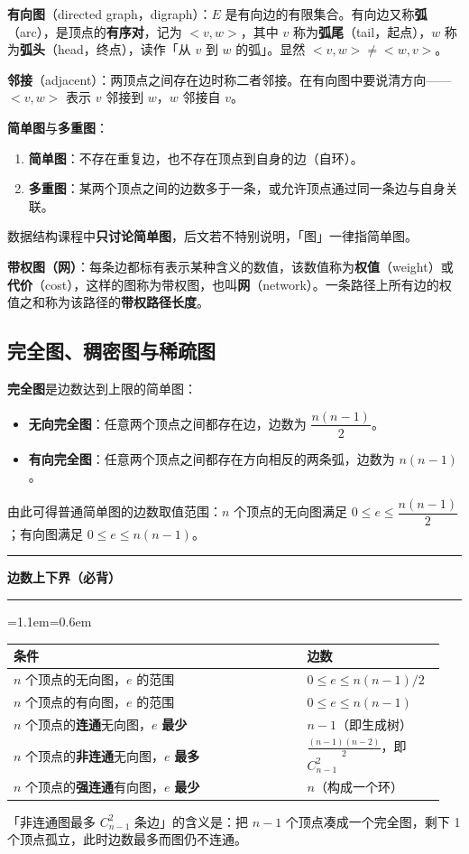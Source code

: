 \documentclass[11pt,openany,UTF8]{ctexbook}
\newcommand{\callouthead}[2]{%
  \par\addvspace{7pt}\noindent
  {\color{#1}\rule[-0.15em]{3pt}{1.05em}}\hspace{0.5em}%
  {\bfseries\color{#1}#2}\par\nobreak\vspace{-0.35em}%
  {\color{rulesep}\hrule height 0.4pt}\nobreak\vspace{0.45em}%
  \begingroup\small\setlength{\parindent}{0pt}%
  \leftskip=1.1em\rightskip=0.6em\noindent\ignorespaces}
\newcommand{\calloutend}{\par\endgroup\addvspace{7pt}}
\newenvironment{callkey}[1]{\callouthead{keybar}{#1}}{\calloutend}
\begin{document}
\textbf{有向图}（directed graph，digraph）：$E$ 是有向边的有限集合。有向边又称\textbf{弧}（arc），是顶点的\textbf{有序对}，记为 $<v,w>$，其中 $v$ 称为\textbf{弧尾}（tail，起点），$w$ 称为\textbf{弧头}（head，终点），读作「从 $v$ 到 $w$ 的弧」。显然 $<v,w>\neq<w,v>$。

\textbf{邻接}（adjacent）：两顶点之间存在边时称二者邻接。在有向图中要说清方向——$<v,w>$ 表示 $v$ 邻接到 $w$，$w$ 邻接自 $v$。

\textbf{简单图}与\textbf{多重图}：

\begin{enumerate}
\item \textbf{简单图}：不存在重复边，也不存在顶点到自身的边（自环）。
\item \textbf{多重图}：某两个顶点之间的边数多于一条，或允许顶点通过同一条边与自身关联。
\end{enumerate}
数据结构课程中\textbf{只讨论简单图}，后文若不特别说明，「图」一律指简单图。

\textbf{带权图（网）}：每条边都标有表示某种含义的数值，该数值称为\textbf{权值}（weight）或\textbf{代价}（cost），这样的图称为带权图，也叫\textbf{网}（network）。一条路径上所有边的权值之和称为该路径的\textbf{带权路径长度}。

\subsection{完全图、稠密图与稀疏图}

\textbf{完全图}是边数达到上限的简单图：

\begin{itemize}
\item \textbf{无向完全图}：任意两个顶点之间都存在边，边数为 $\dfrac{n(n-1)}{2}$。
\item \textbf{有向完全图}：任意两个顶点之间都存在方向相反的两条弧，边数为 $n(n-1)$。
\end{itemize}
由此可得普通简单图的边数取值范围：$n$ 个顶点的无向图满足 $0\le e\le \dfrac{n(n-1)}{2}$；有向图满足 $0\le e\le n(n-1)$。

\begin{callkey}{边数上下界（必背）}
\begingroup\small\setlength{\tabcolsep}{4.0pt}
\begin{longtable}{@{}L{0.6421\linewidth}L{0.3036\linewidth}@{}}
\toprule
\textbf{条件} & \textbf{边数} \\
\midrule
\endhead
$n$ 个顶点的无向图，$e$ 的范围 & $0\le e\le n(n-1)/2$ \\
$n$ 个顶点的有向图，$e$ 的范围 & $0\le e\le n(n-1)$ \\
$n$ 个顶点的\textbf{连通}无向图，$e$ \textbf{最少} & $n-1$（即生成树） \\
$n$ 个顶点的\textbf{非连通}无向图，$e$ \textbf{最多} & $\frac{(n-1)(n-2)}{2}$，即 $C_{n-1}^{2}$ \\
$n$ 个顶点的\textbf{强连通}有向图，$e$ \textbf{最少} & $n$（构成一个环） \\
\bottomrule
\end{longtable}
\endgroup

「非连通图最多 $C_{n-1}^{2}$ 条边」的含义是：把 $n-1$ 个顶点凑成一个完全图，剩下 1 个顶点孤立，此时边数最多而图仍不连通。

\end{callkey}
\end{document}
